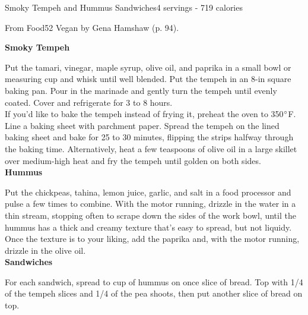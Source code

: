 \begin{recipe}{Smoky Tempeh and Hummus Sandwiches}{4 servings - 719 calories}{}

\freeform From {\normalfont Food52 Vegan} by Gena Hamshaw (p. 94).


\textbf{Smoky Tempeh}

Put the tamari, vinegar, maple syrup, olive oil, and paprika in a small bowl or measuring cup and whisk until well blended. Put the tempeh in an 8-in square baking pan. Pour in the marinade and gently turn the tempeh until evenly coated. Cover and refrigerate for 3 to 8 hours.\\

If you'd like to bake the tempeh instead of frying it, preheat the oven to 350$\degree$F. Line a baking sheet with parchment paper. Spread the tempeh on the lined baking sheet and bake for 25 to 30 minutes, flipping the strips halfway through the baking time. Alternatively, heat a few teaspoons of olive oil in a large skillet over medium-high heat and fry the tempeh until golden on both sides.\\

\textbf{Hummus}

Put the chickpeas, tahina, lemon juice, garlic, and salt in a food processor and pulse a few times to combine. With the motor running, drizzle in the water in a thin stream, stopping often to scrape down the sides of the work bowl, until the hummus has a thick and creamy texture that's easy to spread, but not liquidy. Once the texture is to your liking, add the paprika and, with the motor running, drizzle in the olive oil.\\

\textbf{Sandwiches}

For each sandwich, spread  to  cup of hummus on once slice of bread. Top with 1/4 of the tempeh slices and 1/4 of the pea shoots, then put another slice of bread on top.

\end{recipe}